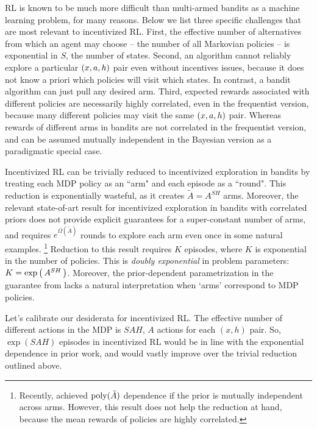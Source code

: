 RL is known to be much more difficult than multi-armed bandits as a machine learning problem, for many reasons. Below we list three specific challenges that are most relevant to incentivized RL. First, the effective number of alternatives from which an agent may choose -- the number of all Markovian policies -- is exponential in $S$, the number of states. Second, an algorithm cannot reliably explore a particular $(x,a,h)$ pair even without incentives issues, because it does not know a priori which policies will visit which states. In contrast, a bandit algorithm can just pull any desired arm. Third, expected rewards associated with different policies are necessarily highly correlated, even in the frequentist version, because many different policies may visit the same $(x,a,h)$ pair. Whereas rewards of different arms in bandits are not correlated in the frequentist version, and can be assumed mutually independent in the Bayesian version as a paradigmatic special case.

\newcommand{\nArmsMAB}{\tilde{A}} %

Incentivized RL can be trivially reduced to incentivized exploration in bandits by treating each MDP policy as an ``arm" and each episode as a ``round". This reduction is exponentially wasteful, as it creates $\nArmsMAB = A^{SH}$ arms. Moreover, the relevant state-of-art result for incentivized exploration in bandits with correlated priors \citep[Section 5]{ICexploration-ec15} does not provide explicit guarantees for a super-constant number of arms, and requires $e^{\Omega(\nArmsMAB)}$ rounds to explore each arm even once in some natural examples.%
\footnote{Recently, \citet{Selke-PoIE-ec21} achieved $\poly(\nArmsMAB)$ dependence if the prior is mutually independent across arms. However, this result does not help the reduction at hand, because the mean rewards of policies are highly correlated. }
{Reduction} to this result requires $K$ episodes, where $K$ is exponential in the number of policies. This is \emph{doubly exponential} in problem parameters:
$K=\exp\left(\, A^{SH} \,\right)$. Moreover, the prior-dependent parametrization in the guarantee from \citep[Section 5]{ICexploration-ec15} lacks a natural interpretation when `arms' correspond to MDP policies.

Let's calibrate our desiderata {for incentivized RL}.
The effective number of different actions in the MDP is $SAH$, \ie $A$ actions for each $(x,h)$ pair. So, $\exp(SAH)$ episodes in incentivized RL would be in line with the exponential dependence in prior work, and would vastly improve over the trivial reduction {outlined above}.


